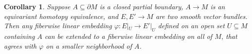 \documentclass[11pt]{amsart}
\newtheorem{cor}{Corollary}[section]
\theoremstyle{definition}
\numberwithin{equation}{section}
\numberwithin{figure}{section}
\newcommand{\Aut}{\textup{Aut}}
\begin{document}
%


\begin{cor}\label{embedding_extension}
	Suppose  $A \subseteq \partial M$ is a closed partial boundary, $A \to M$ is an equivariant homotopy equivalence, and $E, E' \to M$ are two smooth vector bundles. Then any fiberwise linear embedding $\varphi\colon E|_U \to E'|_U$ defined on an open set $U \subseteq M$ containing $A$ can be extended to a fiberwise linear embedding on all of $M$, that agrees with $\varphi$ on a smaller neighborhood of $A$.
\end{cor}
\end{document}

